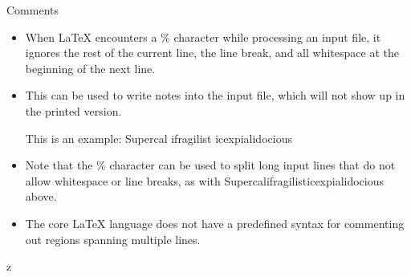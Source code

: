\documentclass[style=lehigh,orient=landscape]{powerdot}
\begin{document}
\begin{wideslide}[bm={Comments},method=direct]{Comments}
  \begin{itemize}
  \item When LaTeX encounters a \% character while processing an input file, it ignores the rest of the current line, the line break, and all whitespace at the beginning of the next line.
  \item This can be used to write notes into the input file, which will not show up in the printed version.
    \begin{LTXexample}[numbers=none,pos=b,showspaces=true]
This is an %
example: Supercal%
            ifragilist%
icexpialidocious
    \end{LTXexample}
  \item Note that the \% character can be used to split long input lines that do not allow whitespace or line breaks, as with Supercalifragilisticexpialidocious above.
  \item The core LaTeX language does not have a predefined syntax for commenting out regions spanning multiple lines.
  \end{itemize}	
\end{wideslide}
z
\end{document}
